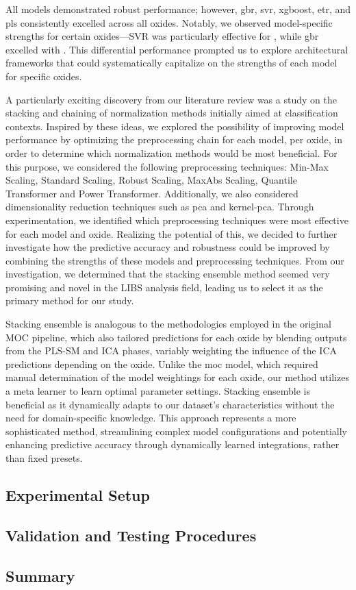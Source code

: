 All models demonstrated robust performance; however, \gls{gbr}, \gls{svr}, \gls{xgboost}, \gls{etr}, and \gls{pls} consistently excelled across all oxides. 
Notably, we observed model-specific strengths for certain oxides—SVR was particularly effective for , while \gls{gbr} excelled with . 
This differential performance prompted us to explore architectural frameworks that could systematically capitalize on the strengths of each model for specific oxides.

A particularly exciting discovery from our literature review was a study on the stacking and chaining of normalization methods initially aimed at classification contexts. 
Inspired by these ideas, we explored the possibility of improving model performance by optimizing the preprocessing chain for each model, per oxide, in order to determine which normalization methods would be most beneficial.
For this purpose, we considered the following preprocessing techniques: Min-Max Scaling, Standard Scaling, Robust Scaling, MaxAbs Scaling, Quantile Transformer and Power Transformer. 
Additionally, we also considered dimensionality reduction techniques such as \gls{pca} and \gls{kernel-pca}.
Through experimentation, we identified which preprocessing techniques were most effective for each model and oxide. 
Realizing the potential of this, we decided to further investigate how the predictive accuracy and robustness could be improved by combining the strengths of these models and preprocessing techniques.
From our investigation, we determined that the stacking ensemble method seemed very promising and novel in the LIBS analysis field, leading us to select it as the primary method for our study.

Stacking ensemble is analogous to the methodologies employed in the original MOC pipeline, which also tailored predictions for each oxide by blending outputs from the PLS-SM and ICA phases, variably weighting the influence of the ICA predictions depending on the oxide.
Unlike the \gls{moc} model, which required manual determination of the model weightings for each oxide, our method utilizes a meta learner to learn optimal parameter settings. 
Stacking ensemble is beneficial as it dynamically adapts to our dataset's characteristics without the need for domain-specific knowledge.
This approach represents a more sophisticated method, streamlining complex model configurations and potentially enhancing predictive accuracy through dynamically learned integrations, rather than fixed presets.

\subsection{Experimental Setup}

\subsection{Validation and Testing Procedures}


\subsection{Summary}

